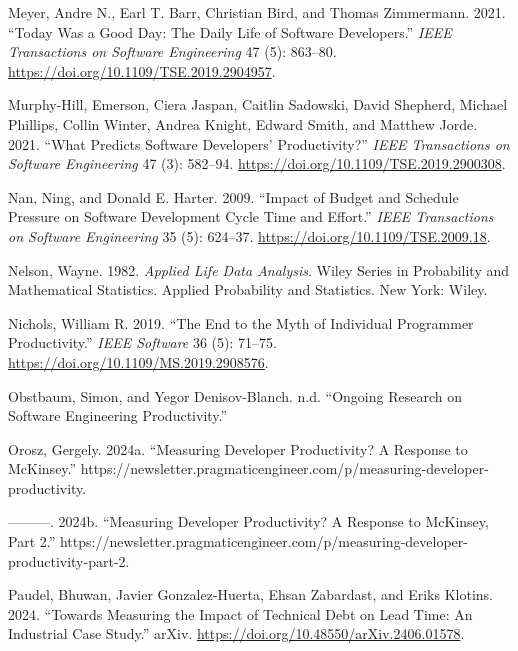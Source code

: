\documentclass[
]{article}
\newlength{\cslhangindent}
\newenvironment{CSLReferences}[2] %
 {\begin{list}{}{%
  \setlength{\itemindent}{0pt}
  \setlength{\leftmargin}{0pt}
  \setlength{\parsep}{0pt}
  \ifodd #1
   \setlength{\leftmargin}{\cslhangindent}
   \setlength{\itemindent}{-1\cslhangindent}
  \fi
  \setlength{\itemsep}{#2\baselineskip}}}
 {\end{list}}
\begin{document}
\begin{CSLReferences}{1}{0}
Meyer, Andre N., Earl T. Barr, Christian Bird, and Thomas Zimmermann.
2021. {``Today {Was} a {Good Day}: {The Daily Life} of {Software
Developers}.''} \emph{IEEE Transactions on Software Engineering} 47 (5):
863--80. \url{https://doi.org/10.1109/TSE.2019.2904957}.

Murphy-Hill, Emerson, Ciera Jaspan, Caitlin Sadowski, David Shepherd,
Michael Phillips, Collin Winter, Andrea Knight, Edward Smith, and
Matthew Jorde. 2021. {``What {Predicts Software Developers}'
{Productivity}?''} \emph{IEEE Transactions on Software Engineering} 47
(3): 582--94. \url{https://doi.org/10.1109/TSE.2019.2900308}.

Nan, Ning, and Donald E. Harter. 2009. {``Impact of {Budget} and
{Schedule Pressure} on {Software Development Cycle Time} and
{Effort}.''} \emph{IEEE Transactions on Software Engineering} 35 (5):
624--37. \url{https://doi.org/10.1109/TSE.2009.18}.

Nelson, Wayne. 1982. \emph{Applied Life Data Analysis}. Wiley Series in
Probability and Mathematical Statistics. {Applied} Probability and
Statistics. New York: Wiley.

Nichols, William R. 2019. {``The {End} to the {Myth} of {Individual
Programmer Productivity}.''} \emph{IEEE Software} 36 (5): 71--75.
\url{https://doi.org/10.1109/MS.2019.2908576}.

Obstbaum, Simon, and Yegor Denisov-Blanch. n.d. {``Ongoing {Research} on
{Software Engineering Productivity}.''}

Orosz, Gergely. 2024a. {``Measuring Developer Productivity? {A} Response
to {McKinsey}.''}
https://newsletter.pragmaticengineer.com/p/measuring-developer-productivity.

---------. 2024b. {``Measuring Developer Productivity? {A} Response to
{McKinsey}, {Part} 2.''}
https://newsletter.pragmaticengineer.com/p/measuring-developer-productivity-part-2.

Paudel, Bhuwan, Javier Gonzalez-Huerta, Ehsan Zabardast, and Eriks
Klotins. 2024. {``Towards {Measuring} the {Impact} of {Technical Debt}
on {Lead Time}: {An Industrial Case Study}.''} arXiv.
\url{https://doi.org/10.48550/arXiv.2406.01578}.


\end{CSLReferences}
\end{document}
